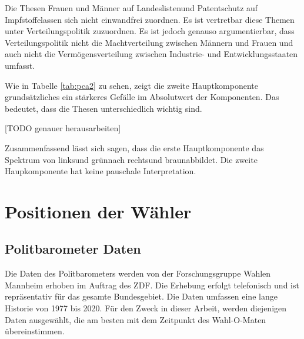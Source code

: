 Die Thesen \glqq Frauen und Männer auf Landeslisten\grqq und \glqq Patentschutz auf Impfstoffe\grqq lassen sich nicht einwandfrei zuordnen. Es ist vertretbar diese Themen unter Verteilungspolitik zuzuordnen. Es ist jedoch genauso argumentierbar, dass Verteilungspolitik nicht die Machtverteilung zwischen Männern und Frauen und auch nicht die Vermögensverteilung zwischen Industrie- und Entwicklungsstaaten umfasst.

Wie in Tabelle \ref{tab:pca2} zu sehen, zeigt die zweite Hauptkomponente grundsätzliches ein stärkeres Gefälle im Absolutwert der Komponenten. Das bedeutet, dass die Thesen unterschiedlich wichtig sind.

[TODO genauer herausarbeiten]
\blindtext

Zusammenfassend lässt sich sagen, dass die erste Hauptkomponente das Spektrum von \glqq links\grqq und \glqq grün\grqq nach \glqq rechts\grqq und \glqq braun\grqq abbildet. Die zweite Haupkomponente hat keine pauschale Interpretation.

\section{Positionen der Wähler}\label{Sec-Wählerpositionen}

\subsection{Politbarometer Daten}
Die Daten des Politbarometers \citep{politbarometer} werden von der Forschungsgruppe Wahlen Mannheim erhoben im Auftrag des ZDF. Die Erhebung erfolgt telefonisch und ist repräsentativ für das gesamte Bundesgebiet. Die Daten umfassen eine lange Historie von 1977 bis 2020. Für den Zweck in dieser Arbeit, werden diejenigen Daten ausgewählt, die am besten mit dem Zeitpunkt des Wahl-O-Maten übereinstimmen.

